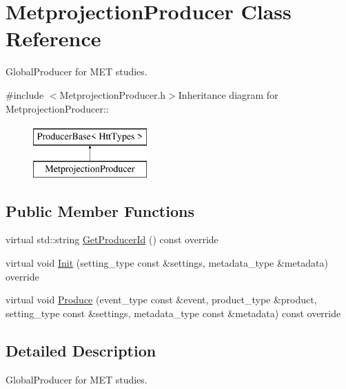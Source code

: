 \hypertarget{classMetprojectionProducer}{
\section{MetprojectionProducer Class Reference}
\label{classMetprojectionProducer}
}


GlobalProducer for MET studies.  


{\ttfamily \#include $<$MetprojectionProducer.h$>$}Inheritance diagram for MetprojectionProducer::\begin{figure}[H]
\begin{center}
\leavevmode
\includegraphics[height=2cm]{classMetprojectionProducer}
\end{center}
\end{figure}
\subsection*{Public Member Functions}
\begin{DoxyCompactItemize}
\item 
virtual std::string \hyperlink{classMetprojectionProducer_a13ec4b981171fa067f4558679b99a9b0}{GetProducerId} () const override
\item 
virtual void \hyperlink{classMetprojectionProducer_a0f529b8d43928e96e4a5f134b8becd95}{Init} (setting\_\-type const \&settings, metadata\_\-type \&metadata) override
\item 
virtual void \hyperlink{classMetprojectionProducer_a6462da23d35e0c04c2b2c65fdfc1ff5f}{Produce} (event\_\-type const \&event, product\_\-type \&product, setting\_\-type const \&settings, metadata\_\-type const \&metadata) const override
\end{DoxyCompactItemize}


\subsection{Detailed Description}
GlobalProducer for MET studies. 

